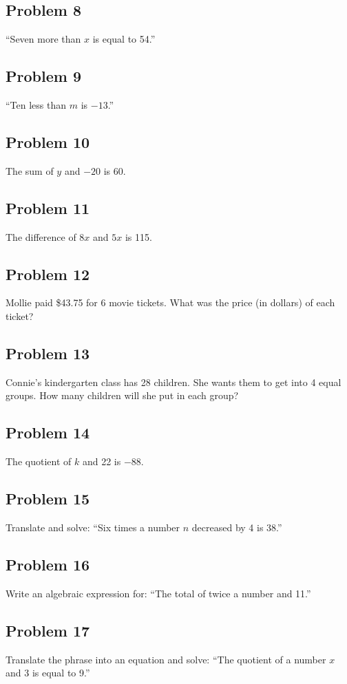 \documentclass[12pt]{article}
\begin{document}
\subsection*{Problem 8}
“Seven more than \(x\) is equal to 54.”

\subsection*{Problem 9}
“Ten less than \(m\) is \(-13\).”

\subsection*{Problem 10}
The sum of \(y\) and \(-20\) is 60.

\subsection*{Problem 11}
The difference of \(8x\) and \(5x\) is 115.

\subsection*{Problem 12}
Mollie paid \$43.75 for 6 movie tickets. What was the price (in dollars) of each ticket?

\subsection*{Problem 13}
Connie’s kindergarten class has 28 children. She wants them to get into 4 equal groups. How many children will she put in each group?

\subsection*{Problem 14}
The quotient of \(k\) and 22 is \(-88\).

\subsection*{Problem 15}
Translate and solve: “Six times a number \(n\) decreased by 4 is 38.”

\subsection*{Problem 16}
Write an algebraic expression for: “The total of twice a number and 11.”

\subsection*{Problem 17}
Translate the phrase into an equation and solve: “The quotient of a number \(x\) and 3 is equal to 9.”
\end{document}
